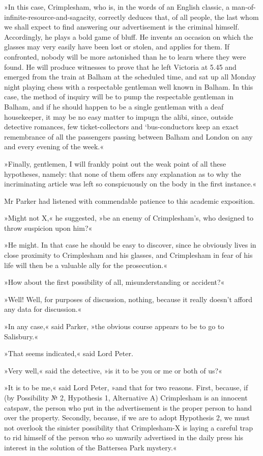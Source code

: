 »In this case, Crimplesham, who is, in the words of an English classic, a man-of-infinite-resource-and-sagacity, correctly deduces that, of all people, the last whom we shall expect to find answering our advertisement is the criminal himself. Accordingly, he plays a bold game of bluff. He invents an occasion on which the glasses may very easily have been lost or stolen, and applies for them. If confronted, nobody will be more astonished than he to learn where they were found. He will produce witnesses to prove that he left Victoria at 5.45 and emerged from the train at Balham at the scheduled time, and sat up all Monday night playing chess with a respectable gentleman well known in Balham. In this case, the method of inquiry will be to pump the respectable gentleman in Balham, and if he should happen to be a single gentleman with a deaf housekeeper, it may be no easy matter to impugn the alibi, since, outside detective romances, few ticket-collectors and `bus-conductors keep an exact remembrance of all the passengers passing between Balham and London on any and every evening of the week.«

»Finally, gentlemen, I will frankly point out the weak point of all these hypotheses, namely: that none of them offers any explanation as to why the incriminating article was left so conspicuously on the body in the first instance.«

Mr Parker had listened with commendable patience to this academic exposition.

»Might not X,« he suggested, »be an enemy of Crimplesham's, who designed to throw suspicion upon him?«

»He might. In that case he should be easy to discover, since he obviously lives in close proximity to Crimplesham and his glasses, and Crimplesham in fear of his life will then be a valuable ally for the prosecution.«

»How about the first possibility of all, misunderstanding or accident?«

»Well! Well, for purposes of discussion, nothing, because it really doesn't afford any data for discussion.«

»In any case,« said Parker, »the obvious course appears to be to go to Salisbury.«

»That seems indicated,« said Lord Peter.

»Very well,« said the detective, »is it to be you or me or both of us?«

»It is to be me,« said Lord Peter, »and that for two reasons. First, because, if (by Possibility № 2, Hypothesis 1, Alternative A) Crimplesham is an innocent catspaw, the person who put in the advertisement is the proper person to hand over the property. Secondly, because, if we are to adopt Hypothesis 2, we must not overlook the sinister possibility that Crimplesham-X is laying a careful trap to rid himself of the person who so unwarily advertised in the daily press his interest in the solution of the Battersea Park mystery.«


